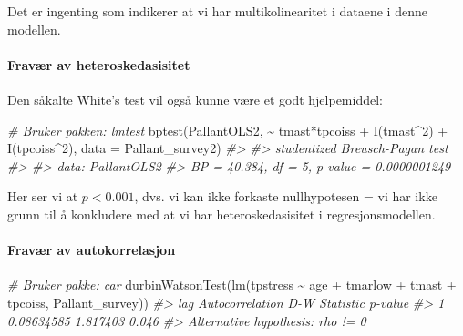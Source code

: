 \documentclass[
]{article}
\newenvironment{Shaded}{\begin{snugshade}}{\end{snugshade}}
\newcommand{\AttributeTok}[1]{\textcolor[rgb]{0.77,0.63,0.00}{#1}}
\newcommand{\CommentTok}[1]{\textcolor[rgb]{0.56,0.35,0.01}{\textit{#1}}}
\newcommand{\DecValTok}[1]{\textcolor[rgb]{0.00,0.00,0.81}{#1}}
\newcommand{\FunctionTok}[1]{\textcolor[rgb]{0.00,0.00,0.00}{#1}}
\newcommand{\NormalTok}[1]{#1}
\newcommand{\SpecialCharTok}[1]{\textcolor[rgb]{0.00,0.00,0.00}{#1}}
\begin{document}
Det er ingenting som indikerer at vi har multikolinearitet i dataene i denne modellen.

\hypertarget{fravuxe6r-av-heteroskedasisitet-2}{%
\paragraph{Fravær av heteroskedasisitet}\label{fravuxe6r-av-heteroskedasisitet-2}}

Den såkalte White's test vil også kunne være et godt hjelpemiddel:

\begin{Shaded}
\begin{Highlighting}[]
\CommentTok{\# Bruker pakken: lmtest}
\FunctionTok{bptest}\NormalTok{(PallantOLS2, }\SpecialCharTok{\textasciitilde{}}\NormalTok{ tmast}\SpecialCharTok{*}\NormalTok{tpcoiss }\SpecialCharTok{+} \FunctionTok{I}\NormalTok{(tmast}\SpecialCharTok{\^{}}\DecValTok{2}\NormalTok{) }\SpecialCharTok{+} \FunctionTok{I}\NormalTok{(tpcoiss}\SpecialCharTok{\^{}}\DecValTok{2}\NormalTok{), }\AttributeTok{data =}\NormalTok{ Pallant\_survey2)}
\CommentTok{\#\textgreater{} }
\CommentTok{\#\textgreater{}  studentized Breusch{-}Pagan test}
\CommentTok{\#\textgreater{} }
\CommentTok{\#\textgreater{} data:  PallantOLS2}
\CommentTok{\#\textgreater{} BP = 40.384, df = 5, p{-}value = 0.0000001249}
\end{Highlighting}
\end{Shaded}

Her ser vi at \(p < 0.001\), dvs. vi kan ikke forkaste nullhypotesen = vi har ikke grunn til å konkludere med at vi har heteroskedasisitet i regresjonsmodellen.

\hypertarget{fravuxe6r-av-autokorrelasjon-2}{%
\paragraph{Fravær av autokorrelasjon}\label{fravuxe6r-av-autokorrelasjon-2}}

\begin{Shaded}
\begin{Highlighting}[]
\CommentTok{\# Bruker pakke: car}
\FunctionTok{durbinWatsonTest}\NormalTok{(}\FunctionTok{lm}\NormalTok{(tpstress }\SpecialCharTok{\textasciitilde{}}\NormalTok{ age }\SpecialCharTok{+}\NormalTok{ tmarlow }\SpecialCharTok{+}\NormalTok{ tmast }\SpecialCharTok{+}\NormalTok{ tpcoiss, Pallant\_survey))}
\CommentTok{\#\textgreater{}  lag Autocorrelation D{-}W Statistic p{-}value}
\CommentTok{\#\textgreater{}    1      0.08634585      1.817403   0.046}
\CommentTok{\#\textgreater{}  Alternative hypothesis: rho != 0}
\end{Highlighting}
\end{Shaded}
\end{document}
